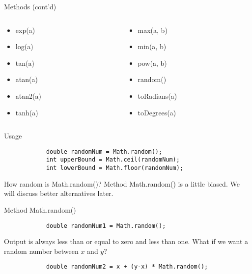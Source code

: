 \documentclass[10pt, compress]{beamer}
\begin{document}
\begin{slide}
	\begin{block}{Methods (cont'd)}
		\begin{columns}
			\begin{column}{0.5\textwidth}
				\begin{itemize}
					\item[] exp(a)
					\item[] log(a)
					\item[] tan(a)
					\item[] atan(a)
					\item[] atan2(a)
					\item[] tanh(a)
				\end{itemize}
			\end{column}
			\begin{column}{0.5\textwidth}
				\begin{itemize}
					\item[] max(a, b)
					\item[] min(a, b)
					\item[] pow(a, b)
					\item[] random()
					\item[] toRadians(a)
					\item[] toDegrees(a)
				\end{itemize}
			\end{column}
		\end{columns}
	\end{block}
	\begin{block}{Usage}
		\begin{verbatim}
			double randomNum = Math.random();
			int upperBound = Math.ceil(randomNum);
			int lowerBound = Math.floor(randomNum);
		\end{verbatim}
	\end{block}
\end{slide}

\begin{slide}
	\begin{block}{How random is Math.random()?}
		Method Math.random() is a little biased. We will discuss better alternatives later.
	\end{block}
	\begin{block}{Method Math.random()}
		\begin{verbatim}
			double randomNum1 = Math.random();
		\end{verbatim}
		Output is always less than or equal to zero and less than one. What if we want a random number between $x$ and $y$?
		\begin{verbatim}
			double randomNum2 = x + (y-x) * Math.random();
		\end{verbatim}
	\end{block}
\end{slide}
\end{document}
